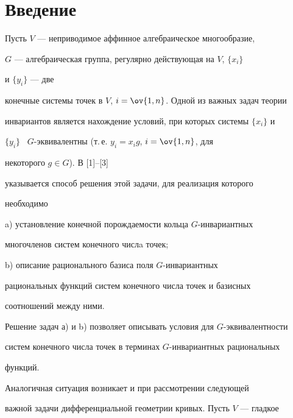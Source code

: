 \label{begin}








\section*{Введение}





Пусть $V$ --- неприводимое аффинное алгебраическое многообразие, 


$G$ --- алгебраическая группа, регулярно действующая на $V$, $\{x_i\}$ 


и $\{y_i\}$ --- две


конечные системы точек в $V$, $i=\ov{1,n}$. Одной из важных задач теории 


инвариантов является нахождение условий, при которых системы $\{x_i\}$ и 


$\{y_i\}$ \ $G$-эквивалентны (т.\,е. $y_i=x_i g$, $i=\ov{1,n}$, для 


некоторого $g\in G$). В [1]--[3]


указывается способ решения этой задачи, для реализация которого 


необходимо





a) установление конечной порождаемости кольца $G$-инвариантных 


многочленов систем конечного числa точек;





b) описание рационального базиса поля $G$-инвариантных 


рациональных функций систем конечного числа точек и базисных 


соотношений между ними.





Решение задач а) и b) позволяет описывать условия для $G$-эквивалентности 


систем конечного числа точек в терминах $G$-инвариантных рациональных 


функций.





Аналогичная ситуация возникает и при рассмотрении следующей 


важной задачи дифференциальной геометрии кривых. Пусть $V$ --- гладкое 


